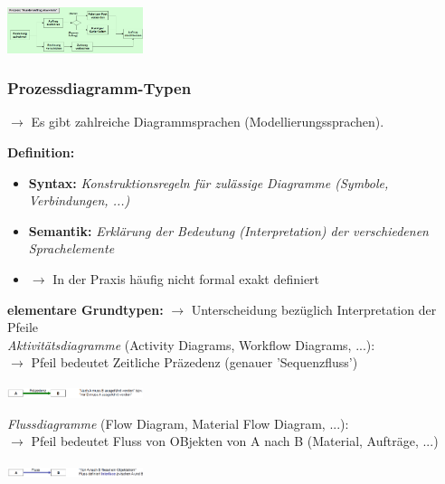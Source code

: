 \documentclass{report}
\newenvironment{Figure}
	{\par\medskip\noindent\minipage{\linewidth}}
	{\endminipage\par\medskip}
\theoremstyle{definition}
\theoremstyle{example}
\begin{document}
\begin{Figure}
\centering
\includegraphics[width=150px]{img/BspProzessdiagramm.png}
	\label{fig:Beispiel eines Prozessdiagrammes für die Kundenauftrag Abwicklung}
\end{Figure}

      \subsubsection{Prozessdiagramm-Typen}
$\rightarrow$ Es gibt zahlreiche Diagrammsprachen (Modellierungssprachen).

\textbf{Definition:}
\begin{itemize}
   \item \textbf{Syntax:} \textit{Konstruktionsregeln für zulässige Diagramme (Symbole, Verbindungen, ...)}
   \item \textbf{Semantik:} \textit{Erklärung der Bedeutung (Interpretation) der verschiedenen Sprachelemente}
   \item $\rightarrow$ In der Praxis häufig nicht formal exakt definiert
\end{itemize}

 \textbf{elementare Grundtypen:} $\rightarrow$ Unterscheidung bezüglich Interpretation der Pfeile\\
 \textit{Aktivitätsdiagramme} (Activity Diagrams, Workflow Diagrams, ...):\\
 $\rightarrow$ Pfeil bedeutet Zeitliche Präzedenz (genauer 'Sequenzfluss') 
 \begin{Figure}
\centering
\includegraphics[width=150px]{img/Praezedenzfluss.png}
	\label{fig:Beispiel eines Aktivitätsdiagramme}
\end{Figure}

\textit{Flussdiagramme} (Flow Diagram, Material Flow Diagram, ...):\\
$\rightarrow$ Pfeil bedeutet Fluss von OBjekten von A nach B (Material, Aufträge, ...)
 \begin{Figure}
\centering
\includegraphics[width=150px]{img/Fluss.png}
	\label{fig:Beispiel eines Flussdiagramms}
\end{Figure}
\end{document}
